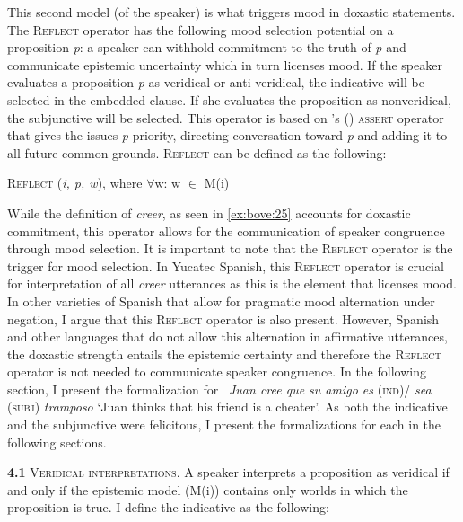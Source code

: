 \documentclass[output=paper,colorlinks,citecolor=brown,
]{langscibook}
\begin{document}
This second model (of the speaker) is what triggers mood in doxastic statements. The \textsc{Reflect} operator has the following mood selection potential on a proposition \textit{p}: a speaker can withhold commitment to the truth of \textit{p }and communicate epistemic uncertainty which in turn licenses mood. If the speaker evaluates a proposition \textit{p} as veridical or anti-veridical, the indicative will be selected in the embedded clause. If she evaluates the proposition as nonveridical, the subjunctive will be selected. This operator is based on \citeauthor{AnandHacquard2014}'s (\citeyear[78]{AnandHacquard2014}) \textsc{assert }operator that gives the issues \textit{p} priority, directing conversation toward \textit{p} and adding it to all future common grounds. \textsc{Reflect }can be defined as the following:

\begin{exe}
    \ex\label{ex:bove:22}
    \textsc{Reflect }(\textit{i, p, w}), where ${\forall}$w: w ${\in}$ M(i)
\end{exe}



While the definition of \textit{creer}, as seen in \ref{ex:bove:25} accounts for doxastic commitment, this operator allows for the communication of speaker congruence through mood selection. It is important to note that the \textsc{Reflect} operator is the trigger for mood selection. In Yucatec Spanish, this \textsc{Reflect }operator is crucial for interpretation of all \textit{creer} utterances as this is the element that licenses mood. In other varieties of Spanish that allow for pragmatic mood alternation under negation, I argue that this \textsc{Reflect }operator is also present. However, Spanish and other languages that do not allow this alternation in affirmative utterances, the doxastic strength entails the epistemic certainty and therefore the \textsc{Reflect }operator is not needed to communicate speaker congruence. In the following section, I present the formalization for \textit{\ Juan cree que su amigo es }(\textsc{ind})/ \textit{sea }(\textsc{subj}) \textit{tramposo }`Juan thinks that his friend is a cheater'. As both the indicative and the subjunctive were felicitous, I present the formalizations for each in the following sections.



\textbf{4.1} \textsc{Veridical interpretations}. A speaker interprets a proposition as veridical if and only if the epistemic model (M(i)) contains only worlds in which the proposition is true. I define the indicative as the following:
\end{document}
